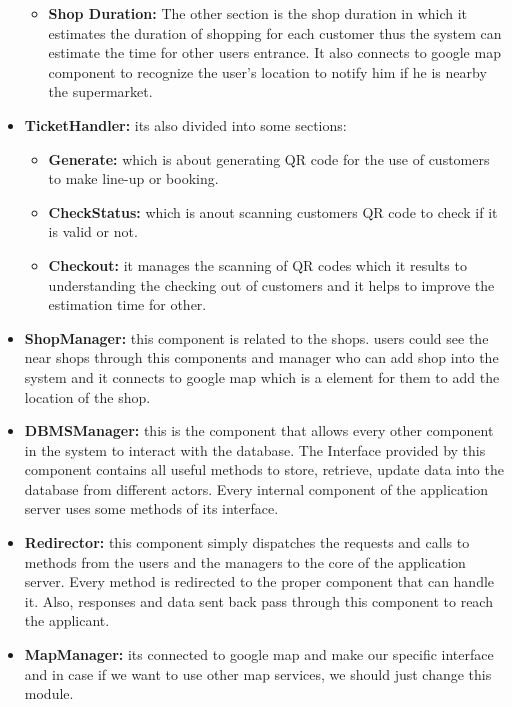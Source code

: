 \begin{itemize}
\begin{itemize}
        \item \textbf{Shop Duration:} The other section is the shop duration in which it estimates the duration of shopping for each customer thus the system can estimate the time for other users entrance.
        It also connects to google map component to recognize the user's location to notify him if he is nearby the supermarket.
    \end{itemize}
    
    \item \textbf{TicketHandler:} its also divided into some sections:
    \begin{itemize}
        \item \textbf{Generate:} which is about generating QR code for the use of customers to make line-up or booking.\\
        \item \textbf{CheckStatus:} which is anout scanning customers QR code to check if it is valid or not.\\
        \item \textbf{Checkout:} it manages the scanning of QR codes which it results to understanding the checking out of customers and it helps to improve the estimation time for other.
    \end{itemize}
    
    \item \textbf{ShopManager:} this component is related to the shops. users could see the near shops through this components and manager who can add shop into the system and it connects to google map which is a element for them to add the location of the shop. \\
    
    \item \textbf{DBMSManager:} this is the component that allows every other component in the system to interact with the database. The Interface provided by this component contains all useful methods to store, retrieve, update data into the database from different actors. Every internal component of the application server uses some methods of its interface. \\
    
    \item \textbf{Redirector:} this component simply dispatches the requests and calls to methods from the users and the managers to the core of the application server. Every method is redirected to the proper component that can handle it. Also, responses and data sent back pass through this component to reach the applicant.\\
    
    \item \textbf{MapManager:} its connected to google map and make our specific interface and in case if we want to use other map services, we should just change this module.
    
\end{itemize}
